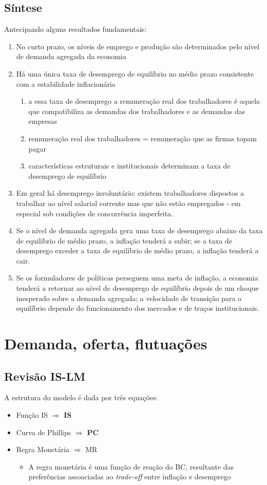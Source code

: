\documentclass[a4paper,12pt]{article}[abntex2]
\begin{document}
\subsection{\textbf{Síntese}}
Antecipando alguns resultados fundamentais:\begin{enumerate}
    \item No curto prazo, os níveis de emprego e produção são determinados pelo nível de demanda agregada da economia
    \item Há uma única taxa de desemprego de equilíbrio no médio prazo consistente com a estabilidade inflacionária \begin{enumerate}
        \item a essa taxa de desemprego a remuneração real dos trabalhadores é aquela que compatibiliza as demandas dos trabalhadores e as demandas das empresas
        \item remuneração real dos trabalhadores = remuneração que as firmas topam pagar
        \item características estruturais e institucionais determinam a taxa de desemprego de equilíbrio
    \end{enumerate}
    \item Em geral há desemprego involuntário: existem trabalhadores dispostos a trabalhar ao nível salarial corrente mas que não estão empregados - em especial sob condições de concorrência imperfeita.
    \item Se o nível de demanda agregada gera uma taxa de desemprego abaixo da taxa de equilíbrio de médio prazo, a inflação tenderá a subir; se a taxa de desemprego exceder a taxa de equilíbrio de médio prazo, a inflação tenderá a cair.
    \item Se os formuladores de políticas perseguem uma meta de inflação, a economia tenderá a retornar ao nível de desemprego de equilíbrio depois de um choque inesperado sobre a demanda agregada; a velocidade de transição para o equilíbrio depende do funcionamento dos mercados e de traços institucionais.
\end{enumerate}

\newpage
\section{\textbf{Demanda, oferta, flutuações}}
\subsection{\textbf{Revisão IS-LM}}
A estrutura do modelo é dada por três equações:\begin{itemize}
    \item Função IS $\Rightarrow$ \textbf{IS}
    \item Curva de Phillips $\Rightarrow$ \textbf{PC}
    \item Regra Monetária $\Rightarrow$ MR \begin{itemize}
        \item A regra monetária é uma função de reação do BC, resultante das preferências assoaciadas ao \textit{trade-off} entre inflação e desemprego
    \end{itemize}
\end{itemize}
\end{document}
